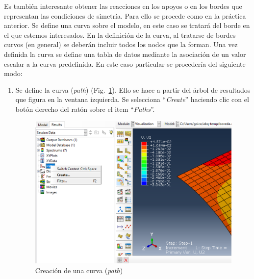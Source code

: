 \documentclass[spanish,a4paper,12pt]{article}
\begin{document}
Es también interesante obtener las reacciones en los apoyos o en los bordes que representan las condiciones de simetría.
Para ello se procede como en la práctica anterior. Se define una curva sobre el modelo, en este caso se tratará del borde en el que estemos interesados.
En la definición de la curva, al tratarse de bordes curvos (en general) se deberán incluir todos los nodos que la forman. 
Una vez definida la curva se define una tabla de datos mediante la asociación de un valor escalar a la curva predefinida.
En este caso particular se procedería del siguiente modo:
\begin{enumerate}
\item Se define la curva (\emph{path}) (Fig.~\ref{fig11}). 
Ello se hace a partir del árbol de resultados que figura en la 
ventana izquierda. 
Se selecciona ``\emph{Create}'' haciendo clic con el botón derecho del ratón sobre el item ``\emph{Paths}''.
\begin{figure}[h!tp]
\centering
	\includegraphics[scale=0.45]{capturas2019/a_fig35.png}
\caption{Creación de una curva (\emph{path})}
\label{fig11}
\end{figure}


\end{enumerate}
\end{document}
